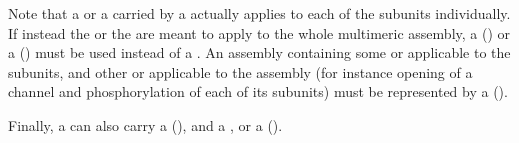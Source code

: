\begin{glyphDescription}
Note that a  or a  carried by a  actually applies to each of the subunits individually.
If instead the  or the  are meant to apply to the whole multimeric assembly, a  () or a  () must be used instead of a .
An assembly containing some  or  applicable to the subunits, and other  or  applicable to the assembly (for instance opening of a channel and phosphorylation of each of its subunits) must be represented by a  ().

Finally, a  can also carry a  (), and a ,  or  a  ().

\end{glyphDescription}

